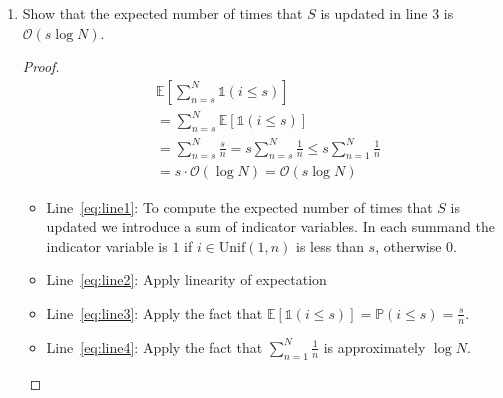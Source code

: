 \documentclass{article}
\begin{document}
\begin{enumerate}
\begin{proof}
        More mathematically: Let $S$ be the final sample subset and $x_i$, $x_j$ two arbitrary but fixed items of the whole set. 
        If the two events, $x_i$ is sampled and $x_j$ is sampled, were independent, then it would follow:
        \[
        \mathbb{P}(x_i \in S \cap x_j \in S) = \mathbb{P}(x_i \in S)\mathbb{P}(x_j \in S)
        \]
        Based on the explanations of the first subtask and the explanation from the lecture notes, it follows that the probability that an arbitrary item $x_k$ is in $S$ is given by
        \[
        \mathbb{P}(x_k \in S) = \frac{s}{N}
        \]
        In particular: 
        \[
        \mathbb{P}(x_i \in S) \cdot \mathbb{P}(x_j \in S) = (\frac{s}{N})^2
        \]
        It follows based on the derivation of subtask 1:
        \[\mathbb{P}(x_i \in S \cap x_j \in S) \stackrel{1.}{=} \frac{s}{N} \cdot \frac{s-1}{N-1} \neq (\frac{s}{N})^2 = \mathbb{P}(x_i \in S) \cdot \mathbb{P}(x_i \in S) 
        \]
        Therefore the two events cannot be independent.
    \end{proof}

    
    \item Show that the expected number of times that $S$ is updated in line 3 is $\mathcal{O}(s \log N)$.

    \begin{proof}
        \begin{align}
            &\mathbb{E}\left[\sum^N_{n=s} \mathds{1}(i \le s)\right] \label{eq:line1}\\
            &= \sum^N_{n=s} \mathbb{E}\left[\mathds{1}(i \le s)\right] \label{eq:line2}\\
            &= \sum^N_{n=s} \frac{s}{n} = s \sum^N_{n=s} \frac{1}{n} \le s \sum^N_{n=1} \frac{1}{n}\label{eq:line3}\\
            &= s \cdot \mathcal{O}(\log N) = \mathcal{O}(s \log N)\label{eq:line4}
        \end{align}

        \begin{itemize}
            \item Line~\ref{eq:line1}: To compute the expected number of times that $S$ is updated we introduce a sum of indicator variables. In each summand the indicator variable is $1$ if $i \in \text{Unif}(1,n)$ is less than $s$, otherwise $0$.
            \item Line~\ref{eq:line2}: Apply linearity of expectation
            \item Line~\ref{eq:line3}: Apply the fact that $\mathbb{E}\left[\mathds{1}(i \le s)\right] = \mathbb{P}(i \le s) = \frac{s}{n}$.
            \item Line~\ref{eq:line4}: Apply the fact that $\sum^N_{n=1} \frac{1}{n}$ is approximately $\log N$.
        \end{itemize}
    \end{proof}
    
\end{enumerate}
\end{document}

